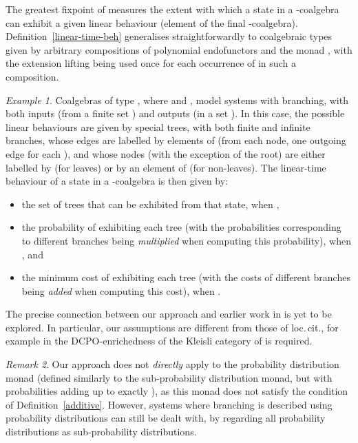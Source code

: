 \documentclass[submission,copyright,creativecommons]{eptcs}
\theoremstyle{plain}\newtheorem{theorem}{Theorem}[section]
\theoremstyle{remark}
\newtheorem{remark}{Remark}[section]
\newtheorem{example}[remark]{Example}
\begin{document}
The greatest fixpoint of  measures the extent with which a state in a -coalgebra can exhibit a given linear behaviour (element of the final -coalgebra). Definition~\ref{linear-time-beh} generalises straightforwardly to coalgebraic types given by arbitrary compositions of polynomial endofunctors and the monad , with the extension lifting  being used once for each occurrence of  in such a composition. 
\begin{example}
\label{input-output}
Coalgebras of type , where  and ,  model systems with branching, with both inputs (from a finite set )  and outputs (in a set ). In this case, the possible linear behaviours are given by special trees, with both finite and infinite branches, whose edges are labelled by elements of  (from each node, one outgoing edge for each ), and whose nodes (with the exception of the root) are either labelled by  (for leaves) or by an element of  (for non-leaves). The linear-time behaviour of a state in a -coalgebra is then given by:
\begin{itemize}
\item the set of trees that can be exhibited from that state, when ,
\item the probability of exhibiting each tree (with the probabilities corresponding to different branches being \emph{multiplied} when computing this probability), when , and 
\item the minimum cost of exhibiting each tree (with the costs of different branches being \emph{added} when computing this cost), when .
\end{itemize}
\end{example}
The precise connection between our approach and earlier work in \cite{HasuoJS07,cirstea-11,JacobsSS12} is yet to be explored. In particular, our assumptions are different from those of loc.\,cit., for example in \cite{HasuoJS07} the DCPO-enrichedness of the Kleisli category of  is required.

\begin{remark}
Our approach does not \emph{directly} apply to the probability distribution monad (defined similarly to the sub-probability distribution monad, but with probabilities adding up to exactly ), as this monad does not satisfy the condition  of Definition~\ref{additive}. However, systems where branching is described using probability distributions can still be dealt with, by regarding all probability distributions as sub-probability distributions.
\end{remark}
\end{document}
